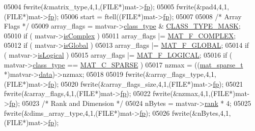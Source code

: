 \begin{DoxyCode}
{{{{{{{{{{{{{{{{{{{{{{{{{{{{{{05004         fwrite(&matrix\_type,4,1,(FILE*)mat->\hyperlink{struct__mat__t_a85f562e407ca9ad4d2a6e14f839432b7}{fp});
05005         fwrite(&pad4,4,1,(FILE*)mat->\hyperlink{struct__mat__t_a85f562e407ca9ad4d2a6e14f839432b7}{fp});
05006         start = ftell((FILE*)mat->\hyperlink{struct__mat__t_a85f562e407ca9ad4d2a6e14f839432b7}{fp});
05007 
05008         \textcolor{comment}{/* Array Flags */}
05009         array\_flags = matvar->\hyperlink{group___m_a_t_aff13035bf3265dd7d9425e5d40c839d4}{class\_type} & \hyperlink{mat5_8c_a24b94e17e9c34b9c795798099c710751}{CLASS\_TYPE\_MASK};
05010         \textcolor{keywordflow}{if} ( matvar->\hyperlink{group___m_a_t_aeb03b3a69f108dc05470b00443a43739}{isComplex} )
05011             array\_flags |= \hyperlink{group___m_a_t_ggab9d6ef9e3ddca78a317b173f01d53fbbacd7b091a11184aad7fc6078c04470780}{MAT\_F\_COMPLEX};
05012         \textcolor{keywordflow}{if} ( matvar->\hyperlink{group___m_a_t_af26c71c4c0ddb14931d15910dddac1bc}{isGlobal} )
05013             array\_flags |= \hyperlink{group___m_a_t_ggab9d6ef9e3ddca78a317b173f01d53fbba49084e0c796aa7963e53f7539525d40d}{MAT\_F\_GLOBAL};
05014         \textcolor{keywordflow}{if} ( matvar->\hyperlink{group___m_a_t_a866c1539e68073a837833d74cd4a65be}{isLogical} )
05015             array\_flags |= \hyperlink{group___m_a_t_ggab9d6ef9e3ddca78a317b173f01d53fbba57eb5c6e200bcbc0f1b7982f29a169c2}{MAT\_F\_LOGICAL};
05016         \textcolor{keywordflow}{if} ( matvar->\hyperlink{group___m_a_t_aff13035bf3265dd7d9425e5d40c839d4}{class\_type} == \hyperlink{group___m_a_t_ggad4d60ae7b709fc81bfd744fb4c857c40a0d5655b7e6178a2242cb3bb56ff4c8d2}{MAT\_C\_SPARSE} )
05017             nzmax = ((\hyperlink{group___m_a_t_structmat__sparse__t}{mat\_sparse\_t} *)matvar->\hyperlink{group___m_a_t_a5672978efa230bbdecdf38ede781f7fa}{data})->nzmax;
05018 
05019         fwrite(&array\_flags\_type,4,1,(FILE*)mat->\hyperlink{struct__mat__t_a85f562e407ca9ad4d2a6e14f839432b7}{fp});
05020         fwrite(&array\_flags\_size,4,1,(FILE*)mat->\hyperlink{struct__mat__t_a85f562e407ca9ad4d2a6e14f839432b7}{fp});
05021         fwrite(&array\_flags,4,1,(FILE*)mat->\hyperlink{struct__mat__t_a85f562e407ca9ad4d2a6e14f839432b7}{fp});
05022         fwrite(&nzmax,4,1,(FILE*)mat->\hyperlink{struct__mat__t_a85f562e407ca9ad4d2a6e14f839432b7}{fp});
05023         \textcolor{comment}{/* Rank and Dimension */}
05024         nBytes = matvar->\hyperlink{group___m_a_t_a84ba70c96ded13cc555fa75b768d9921}{rank} * 4;
05025         fwrite(&dims\_array\_type,4,1,(FILE*)mat->\hyperlink{struct__mat__t_a85f562e407ca9ad4d2a6e14f839432b7}{fp});
05026         fwrite(&nBytes,4,1,(FILE*)mat->\hyperlink{struct__mat__t_a85f562e407ca9ad4d2a6e14f839432b7}{fp});
}}}}}}}}}}}}}}}}}}}}}}}}}}}}}}
\end{DoxyCode}
